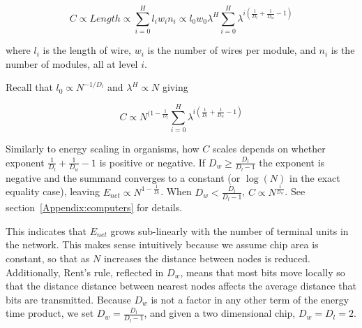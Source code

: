 \documentclass[12pt]{article}
\begin{document}
\begin{equation}
C \propto Length \propto  \sum_{i=0}^H l_i w_i n_i \propto
 l_0 w_0 \lambda^H \sum_{i=0}^H \lambda^{i \left( 
\frac{1}{D_l} + \frac{1}{D_w} -1 \right)}
\end{equation}


\noindent where $l_i$ is the length of wire, $w_i$ is the number of wires per
module, and $n_i$ is the number of modules, all at level $i$.

Recall that $l_0 \propto N^{-1/D_l}$ and $\lambda^H \propto N$ giving 

\begin{equation}
  C \propto  N^{(1- \frac{1}{D_l}} \sum_{i=0}^H \lambda^{i \left( 
\frac{1}{D_l} + \frac{1}{D_w} -1 \right)}
\end{equation}


Similarly to energy scaling in organisms, how $C$ scales depends on whether
exponent $\frac{1}{D_l} + \frac{1}{D_w}-1$ is positive or negative. If $D_w
\geq \frac{D_l}{D_l -1}$ the exponent is negative and the summand converges to
a constant (or $\log(N)$ in the exact equality case), leaving $E_{net} \propto
N^{1-\frac{1}{D_l}}$. When $D_w < \frac{D_l}{D_l -1}$, $C \propto
N^{\frac{1}{D_w}}$. See section~\ref{Appendix:computers} for details.



This indicates that $E_{net}$ grows sub-linearly with the number of terminal
units in the network. This makes sense intuitively because we assume chip area
is constant, so that as $N$ increases the distance between nodes is reduced.
Additionally, Rent's rule, reflected in $D_w$, means that most bits move
locally so that the distance distance between nearest nodes affects the average
distance that bits are transmitted.  Because $D_w$ is not a factor in any other
term of the energy time product, we set $D_w = \frac{D_l}{D_l -1}$, and given a
two dimensional chip, $D_w = D_l = 2$.
\end{document}
